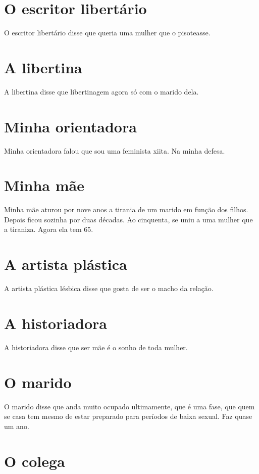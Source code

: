 \chapter{O escritor libertário}

O escritor libertário disse que queria uma mulher que o pisoteasse.

\chapter{A libertina}

A libertina disse que libertinagem agora só com o marido dela.

\chapter{Minha orientadora}

Minha orientadora falou que sou uma feminista xiita. Na minha
defesa.

\chapter{Minha mãe}

Minha mãe aturou por nove anos a tirania de um marido em função dos
filhos. Depois ficou sozinha por duas décadas. Ao cinquenta, se uniu a
uma mulher que a tiraniza. Agora ela tem 65.

\chapter{A artista plástica}

A artista plástica lésbica disse que gosta de ser o macho da relação.

\chapter{A historiadora}

A historiadora disse que ser mãe é o sonho de toda mulher.

\chapter{O marido}

O marido disse que anda muito ocupado ultimamente, que é uma fase, que
quem se casa tem mesmo de estar preparado para períodos de baixa sexual.
Faz quase um ano.

\chapter{O colega}

